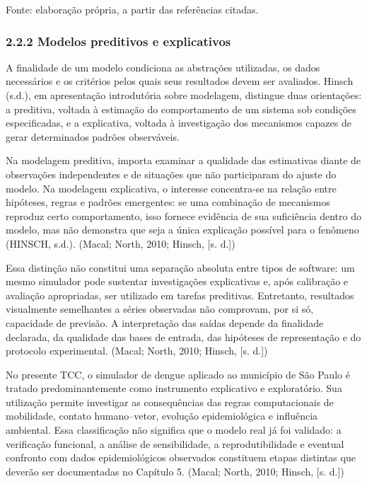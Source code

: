 Fonte: elaboração própria, a partir das referências citadas.

\subsubsection{2.2.2 Modelos preditivos e
explicativos}\label{modelos-preditivos-e-explicativos}

A finalidade de um modelo condiciona as abstrações utilizadas, os dados
necessários e os critérios pelos quais seus resultados devem ser
avaliados. Hinsch (s.d.), em apresentação introdutória sobre modelagem,
distingue duas orientações: a preditiva, voltada à estimação do
comportamento de um sistema sob condições especificadas, e a
explicativa, voltada à investigação dos mecanismos capazes de gerar
determinados padrões observáveis.

Na modelagem preditiva, importa examinar a qualidade das estimativas
diante de observações independentes e de situações que não participaram
do ajuste do modelo. Na modelagem explicativa, o interesse concentra-se
na relação entre hipóteses, regras e padrões emergentes: se uma
combinação de mecanismos reproduz certo comportamento, isso fornece
evidência de sua suficiência dentro do modelo, mas não demonstra que
seja a única explicação possível para o fenômeno (HINSCH, s.d.). (Macal;
North, 2010; Hinsch, {[}s. d.{]})

Essa distinção não constitui uma separação absoluta entre tipos de
software: um mesmo simulador pode sustentar investigações explicativas
e, após calibração e avaliação apropriadas, ser utilizado em tarefas
preditivas. Entretanto, resultados visualmente semelhantes a séries
observadas não comprovam, por si só, capacidade de previsão. A
interpretação das saídas depende da finalidade declarada, da qualidade
das bases de entrada, das hipóteses de representação e do protocolo
experimental. (Macal; North, 2010; Hinsch, {[}s. d.{]})

No presente TCC, o simulador de dengue aplicado ao município de São
Paulo é tratado predominantemente como instrumento explicativo e
exploratório. Sua utilização permite investigar as consequências das
regras computacionais de mobilidade, contato humano--vetor, evolução
epidemiológica e influência ambiental. Essa classificação não significa
que o modelo real já foi validado: a verificação funcional, a análise de
sensibilidade, a reprodutibilidade e eventual confronto com dados
epidemiológicos observados constituem etapas distintas que deverão ser
documentadas no Capítulo 5. (Macal; North, 2010; Hinsch, {[}s. d.{]})


